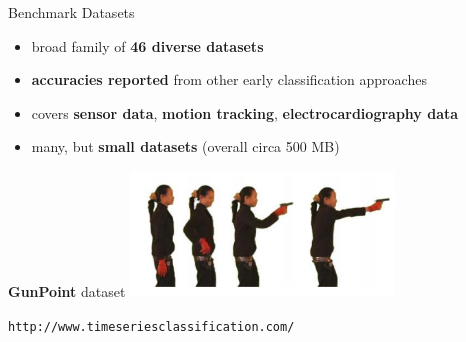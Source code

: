\begin{frame}{Benchmark Datasets}

%		
\begin{itemize}[leftmargin=0cm]
	\item broad family of \textbf{46 diverse datasets}
	\item \textbf{accuracies reported} from other early classification approaches
	\item covers \textbf{sensor data}, \textbf{motion tracking}, \textbf{electrocardiography data}
	\item many, but \textbf{small datasets} \small{(overall circa 500 MB)}
\end{itemize}

{\textbf{GunPoint} dataset}
\vspace{.5em}
\centering\includegraphics[width=7cm]{images/GunPoint}

\vspace{.5em}

{\small \texttt{http://www.timeseriesclassification.com/}
}
\end{frame}

